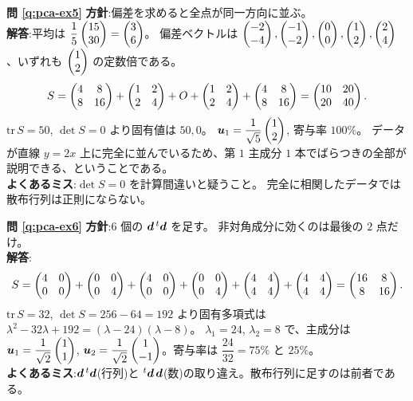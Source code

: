 \noindent\textbf{問 \ref{q:pca-ex5}}\quad
\textbf{方針}:偏差を求めると全点が同一方向に並ぶ。\\
\textbf{解答}:平均は $\dfrac{1}{5}\begin{pmatrix}15 \\ 30\end{pmatrix} = \begin{pmatrix}3 \\ 6\end{pmatrix}$。
偏差ベクトルは
$\begin{pmatrix}-2 \\ -4\end{pmatrix}, \begin{pmatrix}-1 \\ -2\end{pmatrix}, \begin{pmatrix}0 \\ 0\end{pmatrix}, \begin{pmatrix}1 \\ 2\end{pmatrix},
\begin{pmatrix}2 \\ 4\end{pmatrix}$、いずれも $\begin{pmatrix}1 \\ 2\end{pmatrix}$ の定数倍である。
\[
S = \begin{pmatrix}4 & 8 \\ 8 & 16\end{pmatrix} + \begin{pmatrix}1 & 2 \\ 2 & 4\end{pmatrix} + O
+ \begin{pmatrix}1 & 2 \\ 2 & 4\end{pmatrix} + \begin{pmatrix}4 & 8 \\ 8 & 16\end{pmatrix}
= \begin{pmatrix}10 & 20 \\ 20 & 40\end{pmatrix}.
\]
$\mathrm{tr}\,S = 50$, $\det S = 0$ より固有値は $50, 0$。
$\bm{u}_1 = \dfrac{1}{\sqrt{5}}\begin{pmatrix}1 \\ 2\end{pmatrix}$, 寄与率 $100\%$。
データが直線 $y = 2x$ 上に完全に並んでいるため、第 $1$ 主成分
$1$ 本でばらつきの全部が説明できる、ということである。\\
\textbf{よくあるミス}:$\det S = 0$ を計算間違いと疑うこと。
完全に相関したデータでは散布行列は正則にならない。

\bigskip
\noindent\textbf{問 \ref{q:pca-ex6}}\quad
\textbf{方針}:$6$ 個の $\bm{d}\,{}^t\bm{d}$ を足す。
非対角成分に効くのは最後の $2$ 点だけ。\\
\textbf{解答}:
\[
S = \begin{pmatrix}4 & 0 \\ 0 & 0\end{pmatrix} + \begin{pmatrix}0 & 0 \\ 0 & 4\end{pmatrix}
+ \begin{pmatrix}4 & 0 \\ 0 & 0\end{pmatrix} + \begin{pmatrix}0 & 0 \\ 0 & 4\end{pmatrix}
+ \begin{pmatrix}4 & 4 \\ 4 & 4\end{pmatrix} + \begin{pmatrix}4 & 4 \\ 4 & 4\end{pmatrix}
= \begin{pmatrix}16 & 8 \\ 8 & 16\end{pmatrix}.
\]
$\mathrm{tr}\,S = 32$, $\det S = 256 - 64 = 192$ より固有多項式は
$\lambda^2 - 32\lambda + 192 = (\lambda - 24)(\lambda - 8)$。
$\lambda_1 = 24$, $\lambda_2 = 8$ で、主成分は
$\bm{u}_1 = \dfrac{1}{\sqrt{2}}\begin{pmatrix}1 \\ 1\end{pmatrix}$,
$\bm{u}_2 = \dfrac{1}{\sqrt{2}}\begin{pmatrix}1 \\ -1\end{pmatrix}$。寄与率は
$\dfrac{24}{32} = 75\%$ と $25\%$。\\
\textbf{よくあるミス}:$\bm{d}\,{}^t\bm{d}$(行列)と
${}^t\bm{d}\,\bm{d}$(数)の取り違え。散布行列に足すのは前者である。

